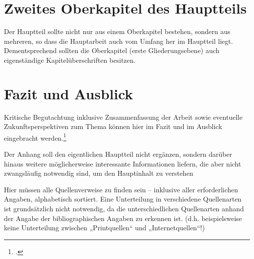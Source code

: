 \documentclass[12pt,toc=bib,toc=listof]{scrreprt}
\newcounter{savepage}
\begin{document}

\chapter{Zweites Oberkapitel des Hauptteils} %
\label{sec:zweiteskapitel}

Der Hauptteil sollte nicht nur aus einem Oberkapitel bestehen, sondern aus mehreren, so dass die Hauptarbeit auch vom Umfang her im Hauptteil liegt. Dementsprechend sollten die Oberkapitel (erste Gliederungsebene) auch eigenständige Kapitelüberschriften besitzen.


\chapter{Fazit und Ausblick} %
\label{sec:fazit}

Kritische Begutachtung inklusive Zusammenfassung der Arbeit sowie eventuelle Zukunftsperspektiven zum Thema können hier im Fazit und im Ausblick eingebracht werden.\footcite [Vgl.] [] {HAN2016S30}


\appendix
\newpage

\setcounter{page}{\thesavepage}

\label{sec:anhang}

Der Anhang soll den eigentlichen Hauptteil nicht ergänzen, sondern darüber hinaus weitere möglicherweise interessante Informationen liefern, die aber nicht zwangsläufig notwendig sind, um den Hauptinhalt zu verstehen

\newpage

\printbibliography[heading=head]

\vspace{2cm}

Hier müssen alle Quellenverweise zu finden sein – inklusive aller erforderlichen Angaben, alphabetisch sortiert. Eine Unterteilung in verschiedene Quellenarten ist grundsätzlich nicht notwendig, da die unterschiedlichen Quellenarten anhand der Angabe der bibliographischen Angaben zu erkennen ist. (d.h. beispielsweise keine Unterteilung zwischen „Printquellen“ und „Internetquellen“!)

\newpage
\end{document}
